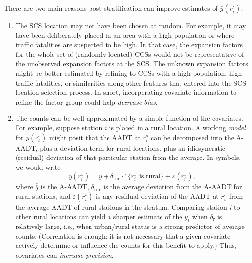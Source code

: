 \documentclass[11pt]{article}
\begin{document}
There are two main reasons post-stratification can improve estimates of
\(\bar{y}(r_i^s)\):

\begin{enumerate}
\def\labelenumi{\arabic{enumi}.}
\item
  The SCS location may not have been chosen at random. For example, it
  may have been deliberately placed in an area with a high population or
  where traffic fatalities are suspected to be high. In that case, the
  expansion factors for the whole set of (randomly located) CCSs would
  not be representative of the unobserved expansion factors at the SCS.
  The unknown expansion factors might be better estimated by refining to
  CCSs with a high population, high traffic fatalities, or similarities
  along other features that entered into the SCS location selection
  process. In short, incorporating covariate information to refine the
  factor group could help \emph{decrease bias}.
\item
  The counts can be well-approximated by a simple function of the
  covariates. For example, suppose station \(i\) is placed in a rural
  location. A working \emph{model} for \(\bar{y}(r_i^s)\) might posit
  that the AADT at \(r_i^s\) can be decomposed into the A-AADT, plus a
  deviation term for rural locations, plus an idiosyncratic (residual)
  deviation of that particular station from the average. In symbols, we
  would write
  \[\bar{y}(r_i^s) = \bar{\bar{y}} + \delta_{\mbox{rur}} \cdot 1\{r_i^s \mbox{ is rural}\} + \varepsilon(r_i^s),\]
  where \(\bar{\bar{y}}\) is the A-AADT, \(\delta_{\mbox{rur}}\) is the
  average deviation from the A-AADT for rural stations, and
  \(\varepsilon(r_i^s)\) is any residual deviation of the AADT at
  \(r_i^s\) from the average AADT of rural stations in the stratum.
  Comparing station \(i\) to other rural locations can yield a sharper
  estimate of the \(\bar{y}_i\) when \(\delta_{\mbox{r}}\) is relatively
  large, i.e., when urban/rural status is a strong predictor of average
  counts. (Correlation is enough: it is not necessary that a given
  covariate actively determine or influence the counts for this benefit
  to apply.) Thus, covariates can \emph{increase precision}.
\end{enumerate}
\end{document}
